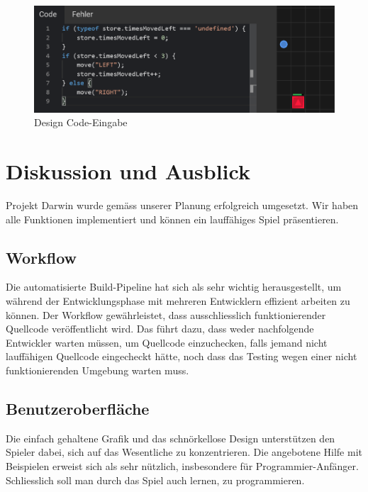 \documentclass[11pt,a4paper,titlepage]{article}
\begin{document}
\begin{figure}[H]
	\centering
	\includegraphics{game2.png}
	\caption{Design Code-Eingabe}
	\label{code-eingabe}
\end{figure}

\newpage

\section{Diskussion und Ausblick}
%

Projekt Darwin wurde gemäss unserer Planung erfolgreich umgesetzt. Wir haben alle Funktionen implementiert und können ein lauffähiges Spiel präsentieren.

\subsection{Workflow}

Die automatisierte Build-Pipeline hat sich als sehr wichtig herausgestellt, um während der Entwicklungsphase mit mehreren Entwicklern effizient arbeiten zu können. Der Workflow gewährleistet, dass ausschliesslich funktionierender Quellcode veröffentlicht wird. Das führt dazu, dass weder nachfolgende Entwickler warten müssen, um Quellcode einzuchecken, falls jemand nicht lauffähigen Quellcode eingecheckt hätte, noch dass das Testing wegen einer nicht funktionierenden Umgebung warten muss.

\subsection{Benutzeroberfläche}

Die einfach gehaltene Grafik und das schnörkellose Design unterstützen den Spieler dabei, sich auf das Wesentliche zu konzentrieren.
Die angebotene Hilfe mit Beispielen erweist sich als sehr nützlich, insbesondere für Programmier-Anfänger. Schliesslich soll man durch das Spiel auch lernen, zu programmieren.
\end{document}

